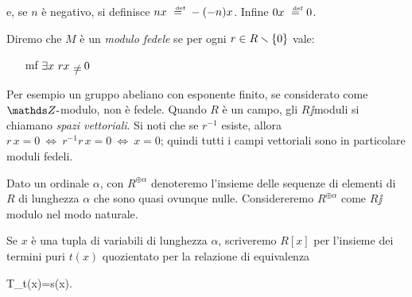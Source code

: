e, se $n$ \`e negativo, si definisce $nx\ \deq\ -(-n)x$. Infine $0x\ \deq\ 0$.

Diremo che $M$ \`e un \emph{modulo fedele\/} se per ogni $r\in R\smallsetminus\{0\}$ vale:
\begin{itemize}
\item[mf] $\E x \ rx\ \neq\ 0$
\end{itemize}
Per esempio un gruppo abeliano con esponente finito, se considerato come $\ZZ\jj$modulo, non \`e fedele. Quando $R$ \`e un campo, gli $R\jj$moduli si chiamano \emph{spazi vettoriali}. Si noti che se $r^{-1}$ esiste, allora $r\,x=0\ \iff\ r^{-1}r\,x=0\ \iff\ x=0$; quindi tutti i campi vettoriali sono in particolare moduli fedeli.
% 
% 
% 
% 
% 

Dato un ordinale $\alpha$, con $R^{\oplus\!\alpha}$ denoteremo l'insieme delle sequenze di elementi di $R$ di lunghezza $\alpha$ che sono quasi ovunque nulle. Considereremo $R^{\oplus\!\alpha}$ come $R\jj$modulo nel modo naturale. 

Se $x$ \`e una tupla di variabili di lunghezza $\alpha$, scriveremo $R[x]$ per l'insieme dei termini puri $t(x)$ quozientato per la relazione di equivalenza

%
{\deq}%
{T_\Rmod\proves t(x)=s(x).}


